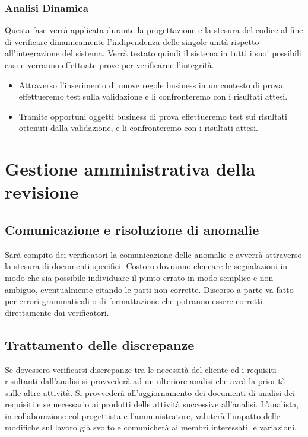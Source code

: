 \documentclass[11pt,titlepage,a4paper]{report}
\begin{document}
\subsection{Analisi Dinamica}
Questa fase verr\`a applicata durante la progettazione e la stesura del codice al fine di verificare dinamicamente l'indipendenza delle singole unit\`a rispetto all'integrazione del sistema. Verr\`a testato quindi il sistema in tutti i suoi possibili casi e verranno effettuate prove per verificarne l'integrit\`a.
\begin{itemize}
\item Attraverso l'inserimento di nuove regole business in un contesto di prova, effettueremo test sulla validazione e li confronteremo con i risultati attesi.
\item Tramite opportuni oggetti business di prova effettueremo test sui risultati ottenuti dalla validazione, e li confronteremo con i risultati attesi.
\end{itemize}

\chapter[Gestione revisione]{Gestione amministrativa della revisione} 

\section{Comunicazione e risoluzione di anomalie}
Sar\`a compito dei verificatori la comunicazione delle anomalie e avverr\`a attraverso la stesura di documenti specifici. Costoro dovranno elencare le segnalazioni in modo che sia possibile individuare il punto errato in modo semplice e non ambiguo, eventualmente citando le parti non corrette. Discorso a parte va fatto per errori grammaticali o di formattazione che potranno essere corretti direttamente dai verificatori.

\section{Trattamento delle discrepanze} 
Se dovessero verificarsi discrepanze tra le necessit\`a del cliente ed i requisiti risultanti dall'analisi si provveder\`a ad un ulteriore analisi che avr\`a la priorit\`a sulle altre attivit\`a. Si provveder\`a all'aggiornamento dei documenti di analisi dei requisiti e se necessario ai prodotti delle attivit\`a successive all'analisi. L'analista, in collaborazione col progettista e l'amministratore, valuter\`a l'impatto delle modifiche sul lavoro gi\`a svolto e comunicher\`a ai membri interessati le variazioni.
\end{document}
